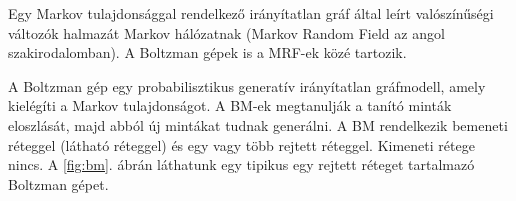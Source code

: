 



Egy Markov tulajdonsággal rendelkező irányítatlan gráf által leírt valószínűségi változók halmazát Markov hálózatnak (Markov Random Field az angol szakirodalomban). A Boltzman gépek is a MRF-ek közé tartozik.

A Boltzman gép egy probabilisztikus generatív irányítatlan gráfmodell, amely kielégíti a Markov tulajdonságot. A BM-ek megtanulják a tanító minták eloszlását, majd abból új mintákat tudnak generálni. A BM rendelkezik bemeneti réteggel (látható réteggel) és egy vagy több rejtett réteggel. Kimeneti rétege nincs. A \ref{fig:bm}. ábrán láthatunk egy tipikus egy rejtett réteget tartalmazó Boltzman gépet.



